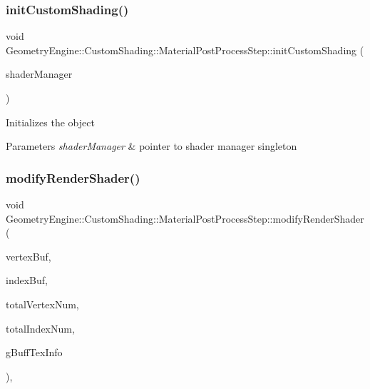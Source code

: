 \subsubsection{\texorpdfstring{initCustomShading()}{initCustomShading()}}
{\footnotesize\ttfamily void Geometry\+Engine\+::\+Custom\+Shading\+::\+Material\+Post\+Process\+Step\+::init\+Custom\+Shading (\begin{DoxyParamCaption}\item[{\mbox{\hyperlink{class_shader_files_1_1_shader_manager}{Shader\+Files\+::\+Shader\+Manager}} $\ast$}]{shader\+Manager }\end{DoxyParamCaption})\hspace{0.3cm}{\ttfamily [virtual]}}

Initializes the object 
\begin{DoxyParams}{Parameters}
{\em shader\+Manager} & pointer to shader manager singleton \\
\hline
\end{DoxyParams}
\mbox{\label{class_geometry_engine_1_1_custom_shading_1_1_material_post_process_step_aab57c59c6338506f46d110556203a625}} 
\subsubsection{\texorpdfstring{modifyRenderShader()}{modifyRenderShader()}}
{\footnotesize\ttfamily void Geometry\+Engine\+::\+Custom\+Shading\+::\+Material\+Post\+Process\+Step\+::modify\+Render\+Shader (\begin{DoxyParamCaption}\item[{Q\+Open\+G\+L\+Buffer $\ast$}]{vertex\+Buf,  }\item[{Q\+Open\+G\+L\+Buffer $\ast$}]{index\+Buf,  }\item[{unsigned int}]{total\+Vertex\+Num,  }\item[{unsigned int}]{total\+Index\+Num,  }\item[{const \mbox{\hyperlink{class_geometry_engine_1_1_g_buffer_texture_info}{G\+Buffer\+Texture\+Info}} \&}]{g\+Buff\+Tex\+Info }\end{DoxyParamCaption})\hspace{0.3cm}{\ttfamily [protected]}, {\ttfamily [virtual]}}

